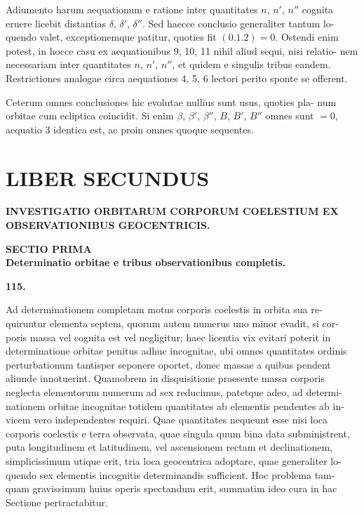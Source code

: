 \documentclass[12pt,a4paper]{article}
\begin{document}
Adiumento harum aequationum e ratione inter quantitates $n$, $n'$, $n''$ cognita
eruere licebit distantias $\delta$, $\delta'$, $\delta''$. Sed haecce conclusio generaliter tantum lo-
quendo valet, exceptionemque patitur, quoties fit $(0.1.2) = 0$. Ostendi enim
potest, in hocce casu ex aequationibus 9, 10, 11 nihil aliud sequi, nisi relatio-
nem necessariam inter quantitates $n$, $n'$, $n''$, et quidem e singulis tribus eandem.
Restrictiones analogae circa aequationes 4, 5, 6 lectori perito sponte se offerent.

Ceterum omnes conclusiones hic evolutae nullius sunt usus, quoties pla-
num orbitae cum ecliptica coincidit. Si enim $\beta$, $\beta'$, $\beta''$, $B$, $B'$, $B''$ omnes sunt
$= 0$, aequatio 3 identica est, ac proin omnes quoque sequentes.


\newpage
\section*{LIBER SECUNDUS}

\begin{center}
\Large\textbf{INVESTIGATIO ORBITARUM CORPORUM COELESTIUM EX}\\
\Large\textbf{OBSERVATIONIBUS GEOCENTRICIS.}
\end{center}

\vspace{1cm}
\begin{center}
\Large\textbf{SECTIO PRIMA}
\\[0.5cm]
\Large\textbf{Determinatio orbitae e tribus observationibus completis.}
\end{center}

\bigskip
\noindent\textbf{115.}

Ad determinationem completam motus corporis coelestis in orbita sua re-
quiruntur elementa septem, quorum autem numerus uno minor evadit, si cor-
poris massa vel cognita est vel negligitur; haec licentia vix evitari poterit in
determinatione orbitae penitus adhuc incognitae, ubi omnes quantitates ordinis
perturbationum tantisper seponere oportet, donec massae a quibus pendent
aliunde innotuerint. Quamobrem in disquisitione praesente massa corporis
neglecta elementorum numerum ad sex reducimus, patetque adeo, ad determi-
nationem orbitae incognitae totidem quantitates ab elementis pendentes ab in-
vicem vero independentes requiri. Quae quantitates nequeunt esse nisi loca
corporis coelestis e terra observata, quae singula quum bina data subministrent,
puta longitudinem et latitudinem, vel ascensionem rectam et declinationem,
simplicissimum utique erit, tria loca geocentrica adoptare, quae generaliter lo-
quendo sex elementis incognitis determinandis sufficient. Hoc problema tam-
quam gravissimum huius operis spectandum erit, summatim ideo cura in hac
Sectione pertractabitur.
\end{document}
